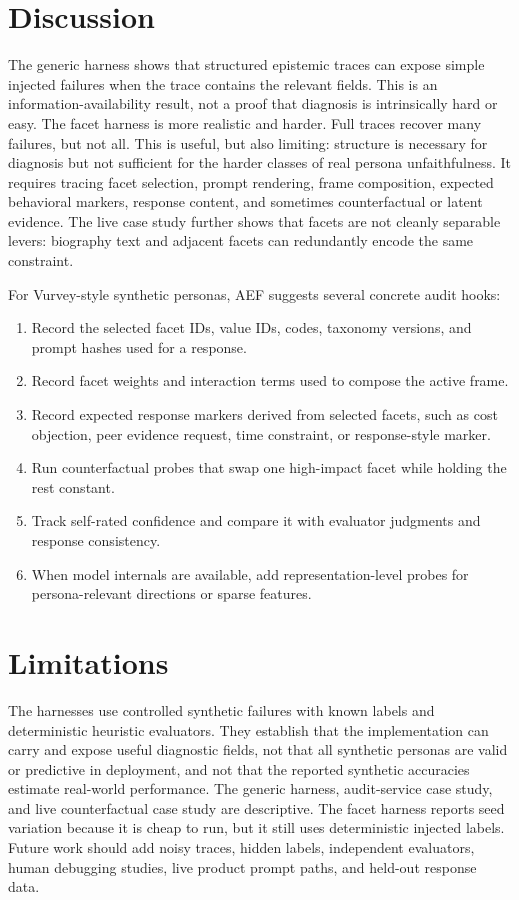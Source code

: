 \documentclass[10pt,a4paper]{article}
\newcommand{\method}{AEF}
\begin{document}
\section{Discussion}
The generic harness shows that structured epistemic traces can expose simple injected failures when the trace contains the relevant fields. This is an information-availability result, not a proof that diagnosis is intrinsically hard or easy. The facet harness is more realistic and harder. Full traces recover many failures, but not all. This is useful, but also limiting: structure is necessary for diagnosis but not sufficient for the harder classes of real persona unfaithfulness. It requires tracing facet selection, prompt rendering, frame composition, expected behavioral markers, response content, and sometimes counterfactual or latent evidence. The live case study further shows that facets are not cleanly separable levers: biography text and adjacent facets can redundantly encode the same constraint.

For Vurvey-style synthetic personas, \method{} suggests several concrete audit hooks:
\begin{enumerate}[leftmargin=*]
  \item Record the selected facet IDs, value IDs, codes, taxonomy versions, and prompt hashes used for a response.
  \item Record facet weights and interaction terms used to compose the active frame.
  \item Record expected response markers derived from selected facets, such as cost objection, peer evidence request, time constraint, or response-style marker.
  \item Run counterfactual probes that swap one high-impact facet while holding the rest constant.
  \item Track self-rated confidence and compare it with evaluator judgments and response consistency.
  \item When model internals are available, add representation-level probes for persona-relevant directions or sparse features.
\end{enumerate}

\section{Limitations}
The harnesses use controlled synthetic failures with known labels and deterministic heuristic evaluators. They establish that the implementation can carry and expose useful diagnostic fields, not that all synthetic personas are valid or predictive in deployment, and not that the reported synthetic accuracies estimate real-world performance. The generic harness, audit-service case study, and live counterfactual case study are descriptive. The facet harness reports seed variation because it is cheap to run, but it still uses deterministic injected labels. Future work should add noisy traces, hidden labels, independent evaluators, human debugging studies, live product prompt paths, and held-out response data.
\end{document}
